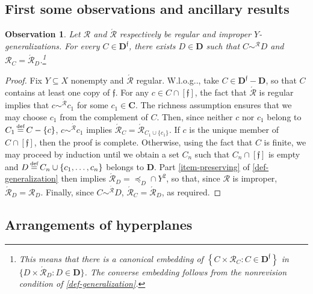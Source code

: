 \documentclass[ecta,nameyear,draft]{econsocart}
\makeatletter
\newcommand{\bs}{-}%
\newcommand{\mc}{\mathcal}
\newcommand\defeq{\mathrel{\overset{\makebox[0pt]{\mbox{\normalfont\tiny def}}}{=}}}%
\newcommand{\novel}{\mathfrak f}
\newcommand{\preceqb}{\mathbin{\preceq}}
\newcommand{\ext}{\mathrel{\mc R}}
\newcommand{\extb}{\mathbin{\mc R}}
\newcommand{\aext}{\mathrel{\acute{\mathrel{\mathcal R}}}}
\newcommand{\aextb}{\mathbin{\acute{\mathbin{\mathcal R}}}}
\newcommand{\mbbd}{{\mathbf D}}
\newcommand{\mbbdp}{{\mathbf D^{\novel}}}
\newcommand{\mbbc}{{\mathbf C}}
\newcommand\Wlog{W\@.l\@.o\@.g\@ifnextchar.{}{.\@}}
\theoremstyle{plain}
\newtheorem{observation}{Observation}
\theoremstyle{remark}
\makeatother
\begin{document}
\begin{appendix}
  \subsection{First some observations and ancillary results}
  \begin{observation}\label{obs-reg-eq}%
    Let $\ext$ and $\aext$ respectively be regular and improper
    $Y$-generalizations. For every $C \in \mbbdp$, there exists $D \in \mbbd$
    such that $C \sim^{\extb} D$ and $\extb_{C} = \aextb_{D}$.\footnote{This
      means that there is a canonical embedding of $\left\{C \times \extb_{C}: C
      \in \mbbdp\right\}$ in $\{D \times \aextb_{D}: D \in \mbbd\}$. The
      converse embedding follows from the nonrevision condition of
    \cref{def-generalization}.}
  \end{observation}
  \begin{proof}\label{proof-reg-eq} Fix $Y\subseteq X$ nonempty and $\aext$
    regular.  \Wlog, take $C \in \mbbdp \bs \mbbd$, so that $C$ contains at least
    one copy of $\novel$.  For any $c \in C \cap [ \novel ]$, the fact that
    $\aext$
    is regular implies that $c \sim^{\aextb} c _ 1$ for some $c _ 1 \in \mbbc$. 
    The richness assumption ensures that we may choose $c _ 1$ from the
    complement of $C$.  Then, since neither $c$ nor
    $c_{1}$ belong to $C _ 1 \defeq C \bs \{c\}$, $c \sim^{\aextb} c_{1}$ implies
    $\aextb_{C} = \aextb _ {C _ 1 \cup \{c_{1}\}}$.  If $c$ is the unique member
    of $C \cap [ \novel ]$, then the proof is complete.  Otherwise, using the
    fact that $C$ is finite, we may proceed by induction until we obtain a set $C
    _ n$ such that $C _ n \cap [\novel ]$ is empty and $D \defeq C _ n \cup \{c _
    1 , \dots , c _ n \}$ belongs to $\mbbd$.  Part \ref{item-preserving} of
    \cref{def-generalization} then implies $\aextb _ { D} = \preceqb _ {D} \cap
    Y^{2}$, so that, since $\ext$ is improper, $\aextb_{D}=\extb_{D}$.  Finally,
    since $C \sim^{\aextb} D$, $\aextb _ {C} = \aextb_{D}$, as required.
  \end{proof}

  \subsection{Arrangements of hyperplanes}


\end{appendix}
\end{document}
